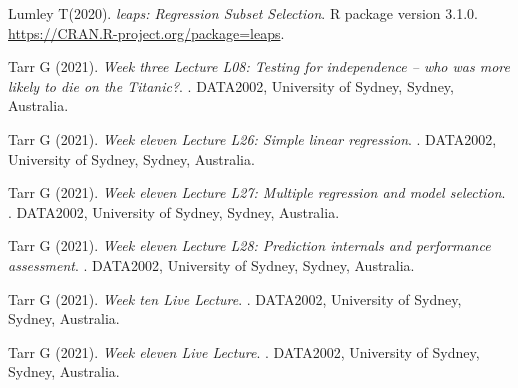 \begin{thebibliography}{3}
\bibitem[{Lumley T(2020)}]{}
Lumley T(2020).
\newblock \emph{leaps: Regression Subset Selection}.
\newblock  R package version 3.1.0. \urlprefix\url{https://CRAN.R-project.org/package=leaps}.

\bibitem[{Tarr G (2021)}]{}
Tarr G (2021).
\newblock \emph{Week three Lecture L08: Testing for independence – who was more likely to die on the Titanic?}.
. DATA2002, University of Sydney, Sydney, Australia. 

\bibitem[{Tarr G (2021)}]{}
Tarr G (2021).
\newblock \emph{Week eleven Lecture L26: Simple linear regression}.
. DATA2002, University of Sydney, Sydney, Australia. 

\bibitem[{Tarr G (2021)}]{}
Tarr G (2021).
\newblock \emph{Week eleven Lecture L27: Multiple regression and model selection}.
. DATA2002, University of Sydney, Sydney, Australia. 

\bibitem[{Tarr G (2021)}]{}
Tarr G (2021).
\newblock \emph{Week eleven Lecture L28: Prediction internals and performance assessment}.
. DATA2002, University of Sydney, Sydney, Australia. 

\bibitem[{Tarr G (2021)}]{}
Tarr G (2021).
\newblock \emph{Week ten Live Lecture}.
. DATA2002, University of Sydney, Sydney, Australia. 

\bibitem[{Tarr G (2021)}]{}
Tarr G (2021).
\newblock \emph{Week eleven Live Lecture}.
. DATA2002, University of Sydney, Sydney, Australia. 

\end{thebibliography}

